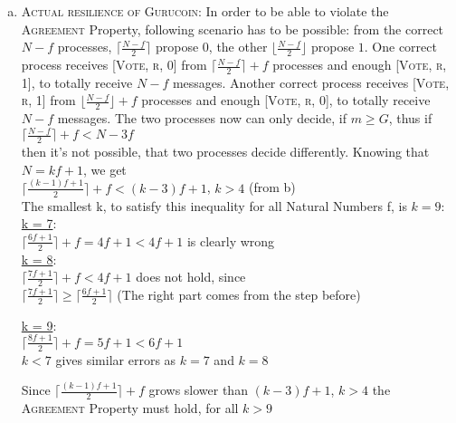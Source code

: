 \documentclass{article}
\begin{document}
\begin{enumerate}[a)]
        \item \textsc{Actual resilience of Gurucoin:}
        In order to be able to violate the \textsc{Agreement} Property, following scenario has to be possible:
        from the correct $N - f$ processes, $\lceil  \frac{N - f}{2} \rceil$ propose $0$, the other $\lfloor \frac{N - f}{2} \rfloor$ propose $1$.
        One correct process receives \textsc{[Vote, r, 0]} from $\lceil  \frac{N - f}{2} \rceil + f$ processes and enough \textsc{[Vote, r, 1]}, to totally receive $N - f$ messages.
        Another correct process receives \textsc{[Vote, r, 1]} from $\lfloor  \frac{N - f}{2} \rfloor + f$ processes and enough \textsc{[Vote, r, 0]}, to totally receive $N - f$ messages.
        The two processes now can only decide, if $m \geq G$, thus if\\
        
        $\lceil  \frac{N - f}{2} \rceil + f < N - 3f$\\
        
        then it's not possible, that two processes decide differently. Knowing that $N = kf + 1$, we get\\

        $\lceil  \frac{(k - 1)f + 1}{2} \rceil + f < (k - 3)f + 1$, $k > 4$ (from b)\\

        The smallest k, to satisfy this inequality for all Natural Numbers f, is $k = 9$: \\
        
        \underline{k = 7}:\\
        $\lceil  \frac{6f + 1}{2} \rceil + f = 4f + 1 < 4f + 1$ is clearly wrong\\
        
        \underline{k = 8}:\\
        $\lceil  \frac{7f + 1}{2} \rceil + f < 4f + 1$ does not hold, since\\

        $\lceil  \frac{7f + 1}{2} \rceil \geq \lceil  \frac{6f + 1}{2} \rceil$ (The right part comes from the step before)

        \underline{k = 9}:\\
        $\lceil  \frac{8f + 1}{2} \rceil + f = 5f + 1 < 6f + 1$\\

        $k < 7$ gives similar errors as $k = 7$ and $k = 8$

        Since $\lceil  \frac{(k - 1)f + 1}{2} \rceil + f$ grows slower than $(k - 3)f + 1$, $k > 4$ the \textsc{Agreement} Property must hold, for all $k > 9$


\end{enumerate}
\end{document}
